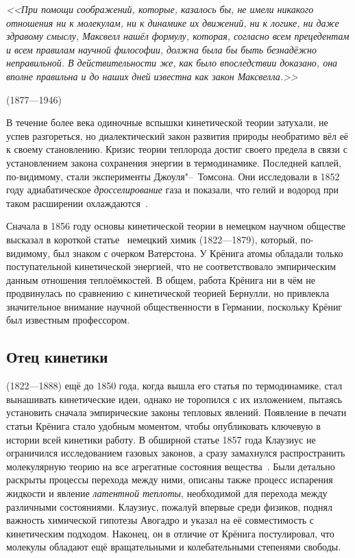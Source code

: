 \documentclass[a4paper, 12pt, oneside]{article} %
\begin{document}
\epigraph{\textit{<<При помощи соображений, которые, казалось бы, не
имели никакого отношения ни к молекулам, ни к динамике их движений, ни к
логике, ни даже здравому смыслу, Максвелл нашёл формулу, которая,
согласно всем прецедентам и всем правилам научной философии, должна была
бы быть безнадёжно неправильной. В действительности же, как было
впоследствии доказано, она вполне правильна и до наших дней известна как
закон Максвелла.>>}}{ (1877---1946)}

В течение более века одиночные вспышки кинетической теории затухали, не
успев разгореться, но диалектический закон развития природы необратимо
вёл её к своему становлению. Кризис теории теплорода достиг своего
предела в связи с установлением закона сохранения энергии в
термодинамике. Последней каплей, по-видимому, стали эксперименты
Джоуля"--~Томсона. Они исследовали в 1852 году адиабатическое
\emph{дросселирование} газа и показали, что гелий и водород при таком
расширении охлаждаются~\cite{joule1852thermal}.

Сначала в 1856 году основы кинетической теории в немецком научном
обществе высказал в короткой статье~\cite{kronig1856grundzuge} немецкий
химик  (1822---1879), который, по-видимому, был
знаком с очерком Ватерстона. У Крёнига атомы обладали только
поступательной кинетической энергией, что не соответствовало
эмпирическим данным отношения теплоёмкостей. В общем, работа Крёнига ни
в чём не продвинулась по сравнению с кинетической теорией Бернулли, но
привлекла значительное внимание научной общественности в Германии,
поскольку Крёниг был известным профессором.

\subsection{Отец кинетики}

 (1822---1888) ещё до 1850 года, когда вышла
его статья по термодинамике, стал вынашивать кинетические идеи, однако
не торопился с их изложением, пытаясь установить сначала эмпирические
законы тепловых явлений. Появление в печати статьи Крёнига стало удобным
моментом, чтобы опубликовать ключевую в истории всей кинетики работу. В
обширной статье 1857 года Клаузиус не ограничился исследованием газовых
законов, а сразу замахнулся распространить молекулярную теорию на все
агрегатные состояния вещества~\cite{clausius1857heat}. Были детально
раскрыты процессы перехода между ними, описаны также процесс испарения
жидкости и явление \emph{латентной теплоты}, необходимой для перехода
между различными состояниями. Клаузиус, пожалуй впервые среди физиков,
поднял важность химической гипотезы Авогадро и указал на её
совместимость с кинетическим подходом. Наконец, он в отличие от Крёнига
постулировал, что молекулы обладают ещё вращательными и колебательными
степенями свободы.
\end{document}
